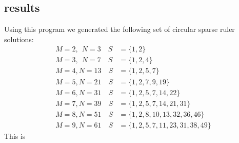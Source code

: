 \documentclass[a4paper, openany, oneside]{memoir}
\begin{document}
\subsection{results}
Using this program we generated the following set of circular sparse ruler solutions:
\begin{align}
M=2,\;\,N=3  \quad S&=\{1,2\}\\
M=3,\;\,N=7  \quad S&=\{1,2,4\}\\
M=4,N=13 \quad S&=\{1,2,5,7\}\\
M=5,N=21 \quad S&=\{1,2,7,9, 19\}\\
M=6,N=31 \quad S&=\{1,2,5,7,14,22\}\\
M=7,N=39 \quad S&=\{1,2,5,7,14,21,31\}\\
M=8,N=51 \quad S&=\{1,2,8,10,13,32,36, 46\}\\
M=9,N=61 \quad S&=\{1,2,5,7,11,23,31, 38, 49\}
\end{align}
This is 
\end{document}
